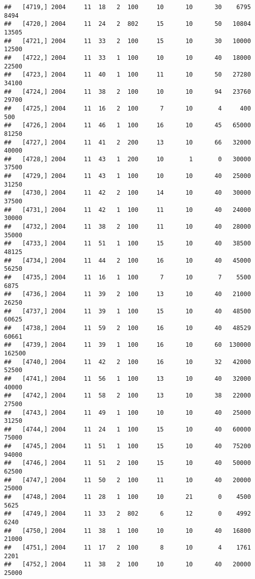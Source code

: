 \documentclass{article}\usepackage[]{graphicx}\usepackage[]{color}
\makeatletter
\newenvironment{kframe}{%
 \def\at@end@of@kframe{}%
 \ifinner\ifhmode%
  \def\at@end@of@kframe{\end{minipage}}%
  \begin{minipage}{\columnwidth}%
 \fi\fi%
 \def\FrameCommand##1{\hskip\@totalleftmargin \hskip-\fboxsep
 \colorbox{shadecolor}{##1}\hskip-\fboxsep
     \hskip-\linewidth \hskip-\@totalleftmargin \hskip\columnwidth}%
 \MakeFramed {\advance\hsize-\width
   \@totalleftmargin\z@ \linewidth\hsize
   \@setminipage}}%
 {\par\unskip\endMakeFramed%
 \at@end@of@kframe}
\newenvironment{knitrout}{}{} %
\makeatother
\begin{document}
\begin{knitrout}
\begin{kframe}
\begin{verbatim}
##   [4719,] 2004     11  18   2  100     10      10      30    6795    8494
##   [4720,] 2004     11  24   2  802     15      10      50   10804   13505
##   [4721,] 2004     11  33   2  100     15      10      30   10000   12500
##   [4722,] 2004     11  33   1  100     10      10      40   18000   22500
##   [4723,] 2004     11  40   1  100     11      10      50   27280   34100
##   [4724,] 2004     11  38   2  100     10      10      94   23760   29700
##   [4725,] 2004     11  16   2  100      7      10       4     400     500
##   [4726,] 2004     11  46   1  100     16      10      45   65000   81250
##   [4727,] 2004     11  41   2  200     13      10      66   32000   40000
##   [4728,] 2004     11  43   1  200     10       1       0   30000   37500
##   [4729,] 2004     11  43   1  100     10      10      40   25000   31250
##   [4730,] 2004     11  42   2  100     14      10      40   30000   37500
##   [4731,] 2004     11  42   1  100     11      10      40   24000   30000
##   [4732,] 2004     11  38   2  100     11      10      40   28000   35000
##   [4733,] 2004     11  51   1  100     15      10      40   38500   48125
##   [4734,] 2004     11  44   2  100     16      10      40   45000   56250
##   [4735,] 2004     11  16   1  100      7      10       7    5500    6875
##   [4736,] 2004     11  39   2  100     13      10      40   21000   26250
##   [4737,] 2004     11  39   1  100     15      10      40   48500   60625
##   [4738,] 2004     11  59   2  100     16      10      40   48529   60661
##   [4739,] 2004     11  39   1  100     16      10      60  130000  162500
##   [4740,] 2004     11  42   2  100     16      10      32   42000   52500
##   [4741,] 2004     11  56   1  100     13      10      40   32000   40000
##   [4742,] 2004     11  58   2  100     13      10      38   22000   27500
##   [4743,] 2004     11  49   1  100     10      10      40   25000   31250
##   [4744,] 2004     11  24   1  100     15      10      40   60000   75000
##   [4745,] 2004     11  51   1  100     15      10      40   75200   94000
##   [4746,] 2004     11  51   2  100     15      10      40   50000   62500
##   [4747,] 2004     11  50   2  100     11      10      40   20000   25000
##   [4748,] 2004     11  28   1  100     10      21       0    4500    5625
##   [4749,] 2004     11  33   2  802      6      12       0    4992    6240
##   [4750,] 2004     11  38   1  100     10      10      40   16800   21000
##   [4751,] 2004     11  17   2  100      8      10       4    1761    2201
##   [4752,] 2004     11  38   2  100     10      10      40   20000   25000

\end{verbatim}
\end{kframe}
\end{knitrout}
\end{document}
